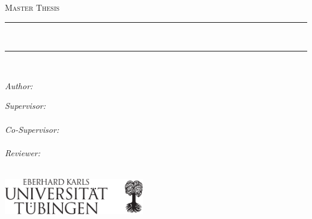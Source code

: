 \begin{titlepage}
\addtocounter{page}{-1}
\begin{center}


\vspace{0.5cm}
\textsc{\Large Master Thesis}\\[0.5cm] %

\rule[0.4cm]{16cm}{0.1pt}\\%
{\huge \bfseries \ttitle\par}\vspace{0.4cm} %
\rule{16cm}{0.1pt}\\ \vspace{1.5cm}
 
\begin{minipage}[t]{0.5\textwidth}
\begin{flushleft} \large
\emph{Author:}\\
\href{https://scholar.google.de/citations?user=20vb63kAAAAJ&hl=de}{\authorname} %
\end{flushleft}
\end{minipage}
\begin{minipage}[t]{0.4\textwidth}
\begin{flushright} \large
\emph{Supervisor:} \\
\href{https://scholar.google.it/citations?user=bqTPA8kAAAAJ&hl=en}{\supname} \\[0.3cm]
\emph{Co-Supervisor:} \\
\href{https://scholar.google.com/citations?user=jQl9RtkAAAAJ&hl=de}{\cosupname} \\[0.3cm]
\emph{Reviewer:} \\
\href{https://scholar.google.de/citations?user=UeG5w08AAAAJ&hl=en}{\reviewname}
\end{flushright}
\end{minipage}\\[1.5cm]

\includegraphics[width= 230px]{Covers/logo_sw.pdf} 
 \vspace{1.2cm}
\vfill


\end{center}
\end{titlepage}
